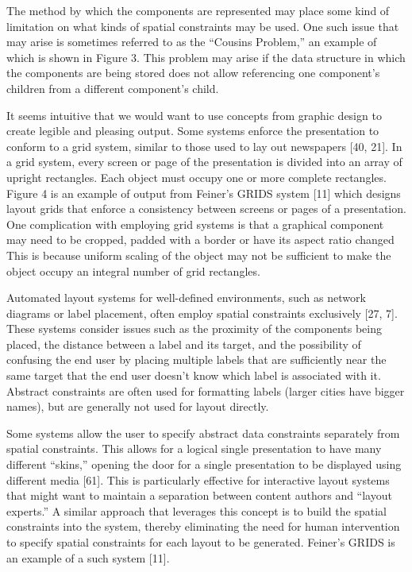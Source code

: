     The method by which the components are represented may place some kind of limitation on what kinds of spatial constraints may be used. One such issue that may arise is sometimes referred to as the “Cousins Problem,” an example of which is shown in Figure 3. This problem may arise if the data structure in which the components are being stored does not allow referencing one component’s children from a different component’s child.

    It seems intuitive that we would want to use concepts from graphic design to create legible and pleasing output. Some systems enforce the presentation to conform to a grid system, similar to those used to lay out newspapers [40, 21]. In a grid system, every screen or page of the presentation is divided into an array of upright rectangles. Each object must occupy one or more complete rectangles. Figure 4 is an example of output from Feiner’s GRIDS system [11] which designs layout grids that enforce a consistency between screens or pages of a presentation. One complication with employing grid systems is that a graphical component may need to be cropped, padded with a border or have its aspect ratio changed This is because uniform scaling of the object may not be sufficient to make the object occupy an integral number of grid rectangles.

    Automated layout systems for well-defined environments, such as network diagrams or label placement, often employ spatial constraints exclusively [27, 7]. These systems consider issues such as the proximity of the components being placed, the distance between a label and its target, and the possibility of confusing the end user by placing multiple labels that are sufficiently near the same target that the end user doesn’t know which label is associated with it. Abstract constraints are often used for formatting labels (larger cities have bigger names), but are generally not used for layout directly.

    Some systems allow the user to specify abstract data constraints separately from spatial constraints. This allows for a logical single presentation to have many different “skins,” opening the door for a single presentation to be displayed using different media [61]. This is particularly effective for interactive layout systems that might want to maintain a separation between content authors and “layout experts.” A similar approach that leverages this concept is to build the spatial constraints into the system, thereby eliminating the need for human intervention to specify spatial constraints for each layout to be generated. Feiner’s GRIDS is an example of a such system [11].

